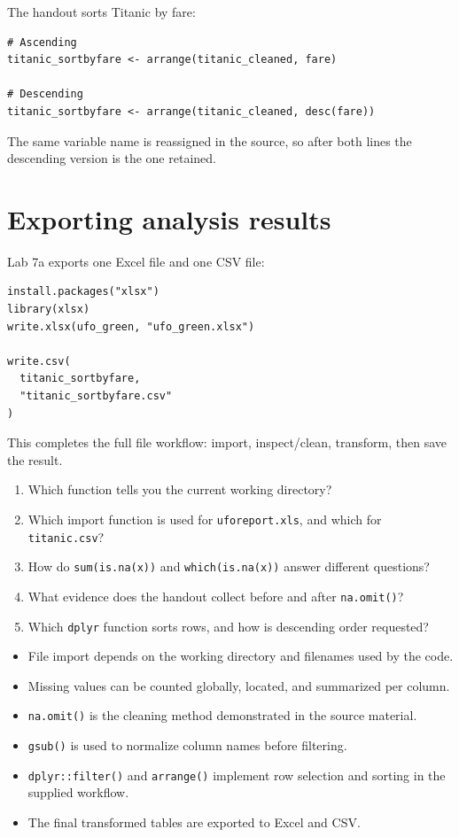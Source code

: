 The handout sorts Titanic by fare:

\begin{lstlisting}[style=dsr]
# Ascending
titanic_sortbyfare <- arrange(titanic_cleaned, fare)

# Descending
titanic_sortbyfare <- arrange(titanic_cleaned, desc(fare))
\end{lstlisting}

The same variable name is reassigned in the source, so after both lines the descending version is the one retained.

\section{Exporting analysis results}

Lab 7a exports one Excel file and one CSV file:

\begin{lstlisting}[style=dsr]
install.packages("xlsx")
library(xlsx)
write.xlsx(ufo_green, "ufo_green.xlsx")

write.csv(
  titanic_sortbyfare,
  "titanic_sortbyfare.csv"
)
\end{lstlisting}

This completes the full file workflow: import, inspect/clean, transform, then save the result.

\begin{quickcheck}
\begin{enumerate}
  \item Which function tells you the current working directory?
  \item Which import function is used for \texttt{uforeport.xls}, and which for \texttt{titanic.csv}?
  \item How do \texttt{sum(is.na(x))} and \texttt{which(is.na(x))} answer different questions?
  \item What evidence does the handout collect before and after \texttt{na.omit()}?
  \item Which \texttt{dplyr} function sorts rows, and how is descending order requested?
\end{enumerate}
\end{quickcheck}

\begin{chapterrecap}
\begin{itemize}
  \item File import depends on the working directory and filenames used by the code.
  \item Missing values can be counted globally, located, and summarized per column.
  \item \texttt{na.omit()} is the cleaning method demonstrated in the source material.
  \item \texttt{gsub()} is used to normalize column names before filtering.
  \item \texttt{dplyr::filter()} and \texttt{arrange()} implement row selection and sorting in the supplied workflow.
  \item The final transformed tables are exported to Excel and CSV.
\end{itemize}
\end{chapterrecap}
